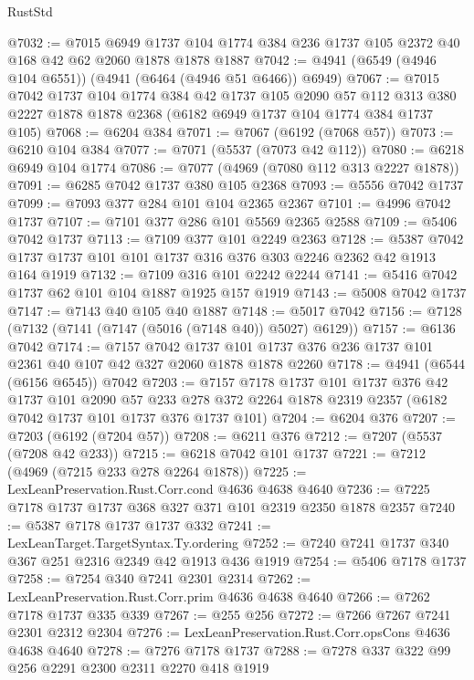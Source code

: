 \begin{lexlean}{RustStd}
\begin{coremodule}
@7032 := @7015
    @6949
    @1737
    @104
    @1774
    @384
    @236
    @1737
    @105
    @2372
    @40
    @168
    @42
    @62
    @2060
    @1878
    @1878
    @1887
@7042 := @4941 (@6549 (@4946 @104 @6551)) (@4941 (@6464 (@4946 @51 @6466)) @6949)
@7067 := @7015
    @7042
    @1737
    @104
    @1774
    @384
    @42
    @1737
    @105
    @2090
    @57
    @112
    @313
    @380
    @2227
    @1878
    @1878
    @2368
    (@6182 @6949 @1737 @104 @1774 @384 @1737 @105)
@7068 := @6204 @384
@7071 := @7067 (@6192 (@7068 @57))
@7073 := @6210 @104 @384
@7077 := @7071 (@5537 (@7073 @42 @112))
@7080 := @6218 @6949 @104 @1774
@7086 := @7077 (@4969 (@7080 @112 @313 @2227 @1878))
@7091 := @6285 @7042 @1737 @380 @105 @2368
@7093 := @5556 @7042 @1737
@7099 := @7093 @377 @284 @101 @104 @2365 @2367
@7101 := @4996 @7042 @1737
@7107 := @7101 @377 @286 @101 @5569 @2365 @2588
@7109 := @5406 @7042 @1737
@7113 := @7109 @377 @101 @2249 @2363
@7128 := @5387 @7042 @1737 @1737 @101 @101 @1737 @316 @376 @303 @2246 @2362 @42 @1913 @164 @1919
@7132 := @7109 @316 @101 @2242 @2244
@7141 := @5416 @7042 @1737 @62 @101 @104 @1887 @1925 @157 @1919
@7143 := @5008 @7042 @1737
@7147 := @7143 @40 @105 @40 @1887
@7148 := @5017 @7042
@7156 := @7128 (@7132 (@7141 (@7147 (@5016 (@7148 @40)) @5027) @6129))
@7157 := @6136 @7042
@7174 := @7157
    @7042
    @1737
    @101
    @1737
    @376
    @236
    @1737
    @101
    @2361
    @40
    @107
    @42
    @327
    @2060
    @1878
    @1878
    @2260
@7178 := @4941 (@6544 (@6156 @6545)) @7042
@7203 := @7157
    @7178
    @1737
    @101
    @1737
    @376
    @42
    @1737
    @101
    @2090
    @57
    @233
    @278
    @372
    @2264
    @1878
    @2319
    @2357
    (@6182 @7042 @1737 @101 @1737 @376 @1737 @101)
@7204 := @6204 @376
@7207 := @7203 (@6192 (@7204 @57))
@7208 := @6211 @376
@7212 := @7207 (@5537 (@7208 @42 @233))
@7215 := @6218 @7042 @101 @1737
@7221 := @7212 (@4969 (@7215 @233 @278 @2264 @1878))
@7225 := LexLeanPreservation.Rust.Corr.cond @4636 @4638 @4640
@7236 := @7225 @7178 @1737 @1737 @368 @327 @371 @101 @2319 @2350 @1878 @2357
@7240 := @5387 @7178 @1737 @1737 @332
@7241 := LexLeanTarget.TargetSyntax.Ty.ordering
@7252 := @7240 @7241 @1737 @340 @367 @251 @2316 @2349 @42 @1913 @436 @1919
@7254 := @5406 @7178 @1737
@7258 := @7254 @340 @7241 @2301 @2314
@7262 := LexLeanPreservation.Rust.Corr.prim @4636 @4638 @4640
@7266 := @7262 @7178 @1737 @335 @339
@7267 := @255 @256
@7272 := @7266 @7267 @7241 @2301 @2312 @2304
@7276 := LexLeanPreservation.Rust.Corr.opsCons @4636 @4638 @4640
@7278 := @7276 @7178 @1737
@7288 := @7278 @337 @322 @99 @256 @2291 @2300 @2311 @2270 @418 @1919

\end{coremodule}
\end{lexlean}

